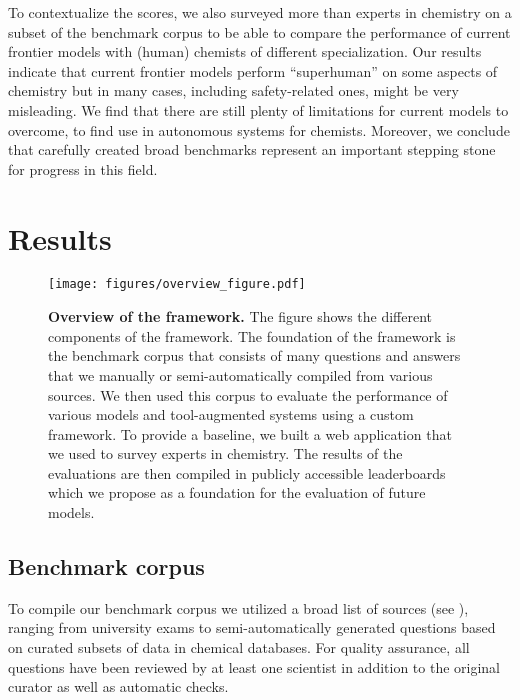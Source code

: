 \documentclass[11pt, oneside]{article}
\begin{document}
\begin{refsection}
To contextualize the scores, we also surveyed more than  experts in chemistry on a subset of the benchmark corpus to be able to compare the performance of current frontier models with (human) chemists of different specialization.
Our results indicate that current frontier models perform \enquote{superhuman} on some aspects of chemistry but in many cases, including safety-related ones, might be very misleading.
We find that there are still plenty of limitations for current models to overcome, to find use in autonomous systems for chemists. Moreover, we conclude that carefully created broad benchmarks represent an important stepping stone for progress in this field.  %

\section{Results}

\begin{figure}
    \texttt{[image: figures/overview\_figure.pdf]}
    \caption{\textbf{Overview of the \chembench framework.} The figure shows the different components of the \chembench framework. 
    The foundation of the framework is the benchmark corpus that consists of many questions and answers that we manually or semi-automatically compiled from various sources.
    We then used this corpus to evaluate the performance of various models and tool-augmented systems using a custom framework. To provide a baseline, we built a web application that we used to survey experts in chemistry.
    The results of the evaluations are then compiled in publicly accessible leaderboards which we propose as a foundation for the evaluation of future models.
    }
    \label{fig:overview_figure}
\end{figure}

\subsection{Benchmark corpus}

To compile our benchmark corpus we utilized a broad list of sources (see ), ranging from university exams to semi-automatically generated questions based on curated subsets of data in chemical databases.
For quality assurance, all questions have been reviewed by at least one scientist in addition to the original curator as well as automatic checks. 


\end{refsection}
\end{document}
